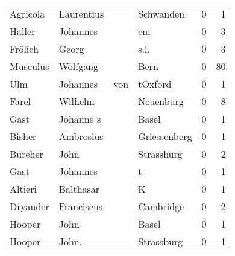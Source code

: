 \begin{tabular}{llllrr}
                 Agricola &                         Laurentius &             &                                   Schwanden &          0 &         1 \\
                   Haller &                           Johannes &             &                                          em &          0 &         3 \\
                  Frölich &                              Georg &             &                                        s.l. &          0 &         3 \\
                 Musculus &                           Wolfgang &             &                                        Bern &          0 &        80 \\
                      Ulm &                           Johannes &         von &                                     tOxford &          0 &         1 \\
                    Farel &                            Wilhelm &             &                                   Neuenburg &          0 &         8 \\
                     Gast &                          Johanne s &             &                                       Basel &          0 &         1 \\
                   Bisher &                          Ambrosius &             &                                Griessenberg &          0 &         1 \\
                  Bureher &                               John &             &                                  Strasshurg &          0 &         2 \\
                     Gast &                           Johannes &             &                                           t &          0 &         1 \\
                  Altieri &                          Balthasar &             &                                           K &          0 &         1 \\
                 Dryander &                         Franciscus &             &                                   Cambridge &          0 &         2 \\
                   Hooper &                               John &             &                                       Basel &          0 &         1 \\
                   Hooper &                              John. &             &                                  Strassburg &          0 &         1 \\

\end{tabular}
